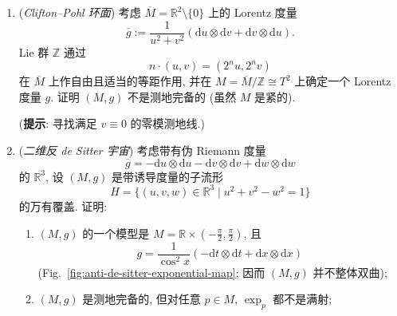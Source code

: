 \begin{RiemannExercise}\label{ex:hawking-singularity-theorem}
\begin{enumerate}[label=(\arabic*),ref=\arabic*,leftmargin=*]
\item\label{ex:clifton-pohl-torus-incompleteness}
(\emph{Clifton–Pohl 环面}) 考虑 $\overline M=\mathbb{R}^2\setminus\{0\}$ 上的 Lorentz 度量
\[
  \overline g:=\frac{1}{u^2+v^2}(\mathrm{d}u\otimes\mathrm{d}v+\mathrm{d}v\otimes\mathrm{d}u).
\]
Lie 群 $\mathbb{Z}$ 通过
\[
  n\cdot(u,v)=(2^nu,2^nv)
\]
在 $\overline M$ 上作自由且适当的等距作用, 并在 $M=\overline M/\mathbb{Z}\cong T^2$ 上确定一个 Lorentz 度量 $g$. 证明 $(M,g)$ 不是测地完备的 (虽然 $M$ 是紧的).

(\textbf{提示}: 寻找满足 $v\equiv0$ 的零模测地线.)
\item\label{ex:anti-de-sitter-geodesic-completeness}
(\emph{二维反 de Sitter 宇宙}) 考虑带有伪 Riemann 度量
\[
  \overline g=-\mathrm{d}u\otimes\mathrm{d}u-\mathrm{d}v\otimes\mathrm{d}v
                +\mathrm{d}w\otimes\mathrm{d}w
\]
的 $\mathbb{R}^3$, 设 $(M,g)$ 是带诱导度量的子流形
\[
  H=\{(u,v,w)\in\mathbb{R}^3\mid u^2+v^2-w^2=1\}
\]
的万有覆盖. 证明:
\begin{enumerate}[label=(\alph*),leftmargin=*]
\item $(M,g)$ 的一个模型是 $M=\mathbb{R}\times(-\frac{\pi}{2},\frac{\pi}{2})$, 且
\[
  g=\frac{1}{\cos^2 x}(-\mathrm{d}t\otimes\mathrm{d}t+\mathrm{d}x\otimes\mathrm{d}x)
\]
(Fig.~\ref{fig:anti-de-sitter-exponential-map}; 因而 $(M,g)$ 并不整体双曲);
\item $(M,g)$ 是测地完备的, 但对任意 $p\in M$, $\exp_p$ 都不是满射;


\end{enumerate}
\end{enumerate}
\end{RiemannExercise}
